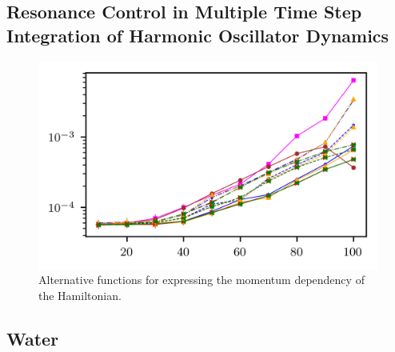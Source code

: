\documentclass[
aip,
jcp,
reprint,
]{revtex4-1}
\begin{document}
\subsection{Resonance Control in Multiple Time Step Integration of Harmonic Oscillator Dynamics}

\begin{figure}
	\centering
	\includegraphics{linear_resonance}
	\caption{Alternative functions for expressing the momentum dependency of the Hamiltonian.}
	\label{fig:linear resonance}
\end{figure}


\subsection{Water}
\end{document}
